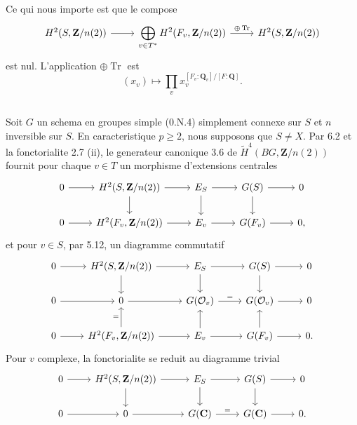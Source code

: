 \documentclass[11pt,a4paper]{article}
\theoremstyle{plain}
\theoremstyle{definition}
\DeclareMathOperator{\Tr}{Tr}
\begin{document}
Ce qui nous importe est que le compose
\begin{equation}\label{6.3.2}
\begin{tikzcd}
H^2(S, \mathbf{Z}/n(2)) \arrow{r} & \displaystyle\bigoplus_{v \in T^*} H^2(F_v, \mathbf{Z}/n(2)) \arrow{r}{\oplus \Tr} & H^2(S, \mathbf{Z}/n(2))
\end{tikzcd}
\end{equation}
est nul. L'application $\oplus \Tr$ est
\begin{equation}\label{6.3.3}
(x_v) \mapsto \prod_v x_v^{[F_v:\mathbf{Q}_v]/[F:\mathbf{Q}]}.
\end{equation}

\subsection{}\label{6.4}

Soit $G$ un schema en groupes simple (0.N.4) simplement connexe sur $S$ et $n$ inversible sur $S$. En caracteristique $p \geq 2$, nous supposons que $S \neq X$. Par 6.2 et la fonctorialite 2.7 (ii), le generateur canonique 3.6 de $\widetilde{H}^4(BG, \mathbf{Z}/n(2))$ fournit pour chaque $v \in T$ un morphisme d'extensions centrales
\[
\begin{tikzcd}
0 \arrow{r} & H^2(S, \mathbf{Z}/n(2)) \arrow{r} \arrow{d} & E_S \arrow{r} \arrow{d} & G(S) \arrow{r} \arrow{d} & 0 \\
0 \arrow{r} & H^2(F_v, \mathbf{Z}/n(2)) \arrow{r} & E_v \arrow{r} & G(F_v) \arrow{r} & 0,
\end{tikzcd}
\]
et pour $v \in S$, par 5.12, un diagramme commutatif
\begin{equation}\label{6.4.1}
\begin{tikzcd}
0 \arrow{r} & H^2(S, \mathbf{Z}/n(2)) \arrow{r} \arrow{d} & E_S \arrow{r} \arrow{d} & G(S) \arrow{r} \arrow{d} & 0 \\
0 \arrow{r} & 0 \arrow{r} & G(\mathcal{O}_v) \arrow{r}{=} & G(\mathcal{O}_v) \arrow{r} & 0 \\
0 \arrow{r} & H^2(F_v, \mathbf{Z}/n(2)) \arrow{r} \arrow{u}{=} & E_v \arrow{r} \arrow{u} & G(F_v) \arrow{r} \arrow{u} & 0.
\end{tikzcd}
\end{equation}
Pour $v$ complexe, la fonctorialite se reduit au diagramme trivial
\[
\begin{tikzcd}
0 \arrow{r} & H^2(S, \mathbf{Z}/n(2)) \arrow{r} \arrow{d} & E_S \arrow{r} \arrow{d} & G(S) \arrow{r} \arrow{d} & 0 \\
0 \arrow{r} & 0 \arrow{r} & G(\mathbf{C}) \arrow{r}{=} & G(\mathbf{C}) \arrow{r} & 0.
\end{tikzcd}
\]
\end{document}

